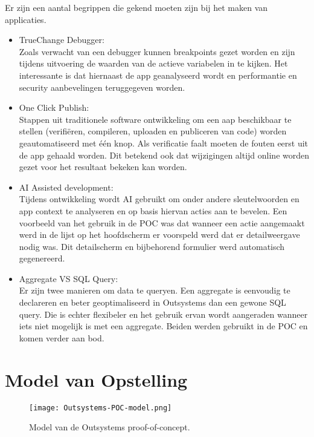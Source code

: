 Er zijn een aantal begrippen die gekend moeten zijn bij het maken van applicaties.
\begin{itemize}
    \item TrueChange Debugger:\\
    Zoals verwacht van een debugger kunnen breakpoints gezet worden en zijn tijdens uitvoering de waarden van de actieve variabelen in te kijken. Het interessante is dat hiernaast de app geanalyseerd wordt en performantie en security aanbevelingen teruggegeven worden.
    \item One Click Publish:\\
    Stappen uit traditionele software ontwikkeling om een aap beschikbaar te stellen (verifiëren, compileren, uploaden en publiceren van code) worden geautomatiseerd met één knop. Als verificatie faalt moeten de fouten eerst uit de app gehaald worden.
    Dit betekend ook dat wijzigingen altijd online worden gezet voor het resultaat bekeken kan worden.
    \item AI Assisted development:\\
    Tijdens ontwikkeling wordt AI gebruikt om onder andere sleutelwoorden en app context te analyseren en op basis hiervan acties aan te bevelen. Een voorbeeld van het gebruik in de POC was dat wanneer een actie aangemaakt werd in de lijst op het hoofdscherm er voorspeld werd dat er detailweergave nodig was. Dit detailscherm en bijbehorend formulier werd automatisch gegenereerd.
    \item Aggregate VS SQL Query:\\
    Er zijn twee manieren om data te queryen. Een aggregate is eenvoudig te declareren en beter geoptimaliseerd in Outsystems dan een gewone SQL query. Die is echter flexibeler en het gebruik ervan wordt aangeraden wanneer iets niet mogelijk is met een aggregate. Beiden werden gebruikt in de POC en komen verder aan bod.
\end{itemize}

\section{Model van Opstelling}

\begin{figure}[h!]
    \centering
    \texttt{[image: Outsystems-POC-model.png]}
    \caption{Model van de Outsystems proof-of-concept.}
    \label{fig:Outsystems-POC-model}
\end{figure}


